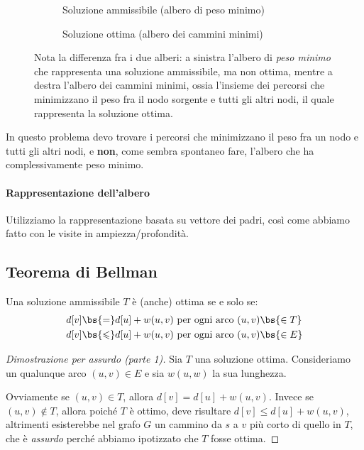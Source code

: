\begin{figure}[H]\centering
	\begin{subfigure}[b]{.5\linewidth}\centering
		
		\caption{Soluzione ammissibile (albero di peso minimo)}%
		\label{fig:soluzione-ammissibile}
	\end{subfigure}%
	\begin{subfigure}[b]{.5\linewidth}\centering
		
		\caption{Soluzione ottima (albero dei cammini minimi)}%
		\label{fig:soluzione-ottima}
	\end{subfigure}
	\caption[Differenza fra albero di peso minimo e albero dei cammini minimi]
	        {Nota la differenza fra i due alberi: a sinistra l'albero di \emph{peso minimo} che rappresenta una soluzione ammissibile, ma non ottima, mentre a destra l'albero dei cammini minimi, ossia l'insieme dei percorsi che minimizzano il peso fra il nodo sorgente e tutti gli altri nodi, il quale rappresenta la soluzione ottima.}
\end{figure}

\begin{note}
In questo problema devo trovare i percorsi che minimizzano il peso fra un nodo e tutti gli altri nodi, e \textbf{non}, come sembra spontaneo fare, l'albero che ha complessivamente peso minimo.
\end{note}

\paragraph{Rappresentazione dell'albero}
Utilizziamo la rappresentazione basata su vettore dei padri, così come abbiamo fatto con le visite in ampiezza/profondità.

\subsection{Teorema di Bellman}

\begin{theorem}
Una soluzione ammissibile \(T\) è (anche) ottima se e solo se:
\begin{align*}
d[v] \bs{=} d[u] + w (u,v)			& \text{ per ogni arco }(u,v) \bs{\in T} \\
d[v] \bs{\leqslant} d[u] + w (u,v)	& \text{ per ogni arco }(u,v) \bs{\in E}
\end{align*}
\end{theorem}
\begin{proof}[Dimostrazione per assurdo (parte 1)]
Sia \(T\) una soluzione ottima.
Consideriamo un qualunque arco \((u,v) \in E\) e sia \(w (u, w)\) la sua lunghezza.

Ovviamente se \((u,v) \in T\), allora \(d[v] = d[u] + w(u,v)\).
Invece se \((u,v) \notin T\), allora poiché \(T\) è ottimo, deve risultare \(d[v] \leqslant d[u] + w(u,v)\), altrimenti esisterebbe nel grafo \(G\) un cammino da \(s\) a \(v\) più corto di quello in \(T\), che è \emph{assurdo} perché abbiamo ipotizzato che \(T\) fosse ottima.
\end{proof}

